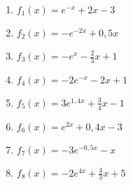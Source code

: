 \begin{minipage}{\textwidth}
	\begin{Exercise}[title={Skizziere die Asymptote, den Teil mit \(ae^{kx}\) sowie das Schaubild der Funktion.}, label=schAsyA1]
		\begin{enumerate}[label=\alph*)]
			\item \(f_1(x)=e^{-x}+2x-3\)
			\item \(f_2(x)=-e^{-2x}+0,5x\)
			\item \(f_3(x)=-e^{x}-\frac{2}{3}x+1\)
			\item \(f_4(x)=-2e^{-x}-2x+1\)
			\item \(f_5(x)=3e^{1,4x}+\frac{3}{4}x-1\)
			\item \(f_6(x)=e^{2x}+0,4x-3\)
			\item \(f_7(x)=-3e^{-0,5x}-x\)
			\item \(f_8(x)=-2e^{4x}+\frac{4}{3}x+5\)
		\end{enumerate}
	\end{Exercise}
\end{minipage}
